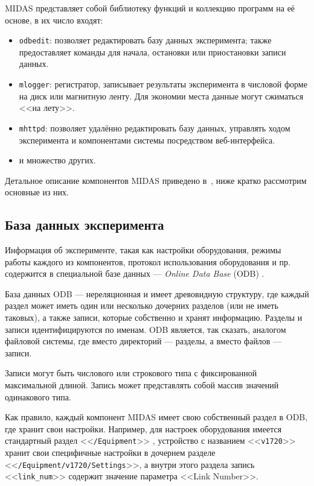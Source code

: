\documentclass[12pt, a4paper, oneside, onecolumn]{book}
\newcommand{\MIDAS}{\mbox{MIDAS}}
\newcommand{\APP}[1]{\mbox{\tt #1}}
\newcommand{\TERM}[1]{{\it #1}}
\newcommand{\ODBNODE}[1]{<<{\tt #1}>>}
\begin{document}
\MIDAS{} представляет собой библиотеку функций и коллекцию программ на её основе, в их число входят:

\begin{itemize}
\item \APP{odbedit}: позволяет редактировать базу данных эксперимента; также предоставляет команды для начала, остановки или приостановки записи данных.
\item \APP{mlogger}: регистратор, записывает результаты эксперимента в числовой форме на диск или магнитную ленту. Для экономии места данные могут сжиматься <<на лету>>.
\item \APP{mhttpd}: позволяет удалённо редактировать базу данных, управлять ходом эксперимента и компонентами системы посредством веб-интерфейса.
\item и множество других.
\end{itemize}

Детальное описание компонентов \MIDAS{} приведено в~\cite{MidasWikiCore}, ниже кратко рассмотрим основные из них.

\subsection{База данных эксперимента}

Информация об эксперименте, такая как настройки оборудования, режимы работы каждого из компонентов, протокол использования оборудования и пр. содержится в специальной базе данных --- \TERM{Online Data Base} (ODB) \cite{MidasWikiODB}.

База данных ODB --- нереляционная и имеет древовидную структуру, где каждый раздел может иметь один или несколько дочерних разделов (или не иметь таковых), а также записи, которые собственно и хранят информацию. Разделы и записи идентифицируются по именам. ODB является, так сказать, аналогом файловой системы, где вместо директорий --- разделы, а вместо файлов --- записи.

Записи могут быть числового или строкового типа с фиксированной максимальной длиной. Запись может представлять собой массив значений одинакового типа.

Как правило, каждый компонент \MIDAS{} имеет свою собственный раздел в ODB, где хранит свои настройки. Например, для настроек оборудования имеется стандартный  раздел \ODBNODE{/Equipment} \cite{MidasWikiEquipment}, устройство с названием \ODBNODE{v1720} хранит свои специфичные настройки в дочернем разделе \ODBNODE{/Equipment/v1720/Settings}, а внутри этого раздела запись \ODBNODE{link\_num} содержит значение параметра <<Link Number>>.
\end{document}
